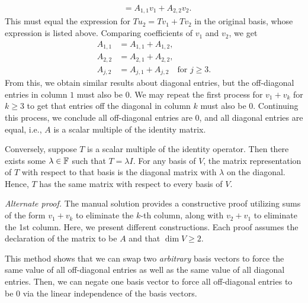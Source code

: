 \begin{exc}
\begin{solution}
\begin{align*}
     &= A_{1,1}v_1+A_{2,2}v_2.
\end{align*}
This must equal the expression for $Tu_2=Tv_1+Tv_2$ in the original basis,
whose expression is listed above. Comparing coefficients of $v_1$ and $v_2$, we
get
\begin{align*}
A_{1,1} &= A_{1,1}+A_{1,2},\\
A_{2,2} &= A_{2,1}+A_{2,2},\\
A_{j,2} &= A_{j,1}+A_{j,2} \quad\text{for } j\ge3.
\end{align*}
From this, we obtain similar results about diagonal entries, but the
off-diagonal entries in column $1$ must also be $0$. We may repeat the first
process for $v_1+v_k$ for $k\ge3$ to get that entries off the diagonal in column
$k$ must also be $0$. Continuing this process, we conclude all off-diagonal
entries are $0$, and all diagonal entries are equal, i.e., $A$ is a scalar
multiple of the identity matrix.

Conversely, suppose $T$ is a scalar multiple of the identity operator. Then
there exists some $\lambda\in\mathbb{F}$ such that $T=\lambda I$. For any basis of $V$,
the matrix representation of $T$ with respect to that basis is the diagonal
matrix with $\lambda$ on the diagonal. Hence, $T$ has the same matrix with
respect to every basis of $V$.

\emph{Alternate proof.} The manual solution provides a constructive proof
utilizing sums of the form $v_1+v_k$ to eliminate the $k$-th column, along with
$v_2+v_1$ to eliminate the 1st column. Here, we present different
constructions. Each proof assumes the declaration of the matrix to be $A$ and
that $\dim V\ge2$.

This method shows that we can swap two \emph{arbitrary} basis vectors to force
the same value of all off-diagonal entries as well as the same value of all
diagonal entries. Then, we can negate one basis vector to force all
off-diagonal entries to be $0$ via the linear independence of the basis
vectors.


\end{solution}
\end{exc}
